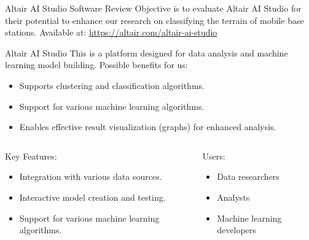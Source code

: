 \begin{frame}{Altair AI Studio Software Review}
    Objective is to evaluate Altair AI Studio for their potential to enhance our research on classifying the terrain of mobile base stations.
    Available at: \url{https://altair.com/altair-ai-studio}
    \begin{block}{Altair AI Studio}
        This is a platform designed for data analysis and machine learning model building. Possible benefits for us:
        \begin{itemize}
            \item Supports clustering and classification algorithms.
            \item Support for various machine learning algorithms.
            \item Enables effective result visualization (graphs) for enhanced analysis.
        \end{itemize}
    \end{block}
    \begin{columns}
        \begin{column}{0.4\paperwidth}
            \begin{block}{Key Features:}
                \begin{itemize}
                    \item Integration with various data sources.
                    \item Interactive model creation and testing.
                    \item Support for various machine learning algorithms.
                \end{itemize}
            \end{block}
        \end{column}
        \begin{column}{0.4\paperwidth}
            \begin{block}{Users:}
                \begin{itemize}
                    \item Data researchers
                    \item Analysts
                    \item Machine learning developers
                \end{itemize}
            \end{block}
        \end{column}
    \end{columns}
\end{frame}

